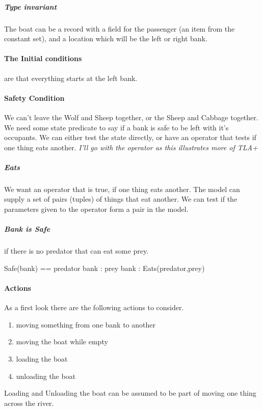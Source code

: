\documentclass{article}
\begin{document}
\subparagraph{Type invariant} The boat can be a record with a field for the
passenger (an item from the constant set), and a location which will be the
left or right bank.

\paragraph{The Initial conditions} are that everything starts at the left
bank.

\paragraph{Safety Condition}
We can't leave the Wolf and Sheep together, or the Sheep and Cabbage together. 
We need some state predicate to say if a bank is safe to be left with it's
occupants.  We can either test the state directly, or have an operator that
tests if one thing eats another.  \emph{I'll go with the operator as this
illustrates more of TLA+}

\subparagraph{Eats} We want an operator that is true, if one thing eats
another.  The model can supply a set of pairs (tuples) of things that eat
another.  We can test if the parameters given to the operator form a pair in
the model.

\subparagraph{Bank is Safe} if there is no predator that can eat some prey.
\begin{tla}
Safe(bank) == \lnot \E predator \in bank :
                    \E prey \in bank : Eats(predator,prey)
\end{tla}
\begin{tlatex}
%
%
\end{tlatex}

\paragraph{Actions} As a first look there are the following actions to
consider.
\begin{enumerate}
	\item moving something from one bank to another
	\item moving the boat while empty
	\item loading the boat
	\item unloading the boat
\end{enumerate}
Loading and Unloading the boat can be assumed to be part of moving one thing
across the river.
\end{document}

